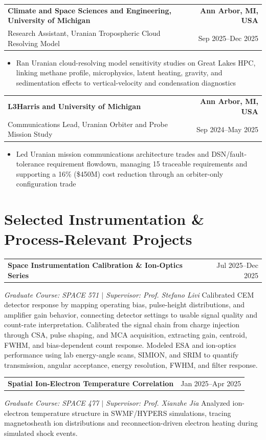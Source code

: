 \documentclass[10pt,a4paper]{article}
\makeatletter
\newcommand{\resumeSubheading}[4]{%
  \begin{tabular*}{\textwidth}{@{\extracolsep{\fill}}l r}
    \textbf{#1} & \textcolor{nameblue}{\textbf{#2}} \\
    #3 & #4
  \end{tabular*}\vspace{-2.0pt}
}
\newcommand{\resumeProjectHeading}[2]{%
  \begin{tabular*}{\textwidth}{@{\extracolsep{\fill}}l r}
    \textbf{#1} & #2
  \end{tabular*}\vspace{-2.0pt}
}
\newcommand{\resumeItemsStart}{\begin{itemize}}
\newcommand{\resumeItemsEnd}{\end{itemize}\vspace{-1.6pt}}
\newcommand{\resumeItem}[1]{\item #1}
\makeatother
\begin{document}
\resumeSubheading
  {Climate and Space Sciences and Engineering, University of Michigan}{Ann Arbor, MI, USA}
  {Research Assistant, Uranian Tropospheric Cloud Resolving Model}{Sep 2025--Dec 2025}
\resumeItemsStart
  \resumeItem{Ran Uranian cloud-resolving model sensitivity studies on Great Lakes HPC, linking methane profile, microphysics, latent heating, gravity, and sedimentation effects to vertical-velocity and condensation diagnostics}
\resumeItemsEnd

\resumeSubheading
  {L3Harris and University of Michigan}{Ann Arbor, MI, USA}
  {Communications Lead, Uranian Orbiter and Probe Mission Study}{Sep 2024--May 2025}
\resumeItemsStart
  \resumeItem{Led Uranian mission communications architecture trades and DSN/fault-tolerance requirement flowdown, managing 15 traceable requirements and supporting a 16\% (\$450M) cost reduction through an orbiter-only configuration trade}
\resumeItemsEnd

\section{Selected Instrumentation \& Process-Relevant Projects}
\resumeProjectHeading{Space Instrumentation Calibration \& Ion-Optics Series}{Jul 2025--Dec 2025}
{\itshape Graduate Course: SPACE 571 $\mid$ Supervisor: Prof. Stefano Livi}\vspace{-1.4pt}
{\hspace{6pt}Calibrated CEM detector response by mapping operating bias, pulse-height distributions, and amplifier gain behavior, connecting detector settings to usable signal quality and count-rate interpretation. Calibrated the signal chain from charge injection through CSA, pulse shaping, and MCA acquisition, extracting gain, centroid, FWHM, and bias-dependent count response. Modeled ESA and ion-optics performance using lab energy-angle scans, SIMION, and SRIM to quantify transmission, angular acceptance, energy resolution, FWHM, and filter response.}\vspace{-0.8pt}

\resumeProjectHeading{Spatial Ion-Electron Temperature Correlation}{Jan 2025--Apr 2025}
{\itshape Graduate Course: SPACE 477 $\mid$ Supervisor: Prof. Xianzhe Jia}\vspace{-1.4pt}
{\hspace{6pt}Analyzed ion-electron temperature structure in SWMF/HYPERS simulations, tracing magnetosheath ion distributions and reconnection-driven electron heating during simulated shock events.}\vspace{-0.6pt}
\end{document}
